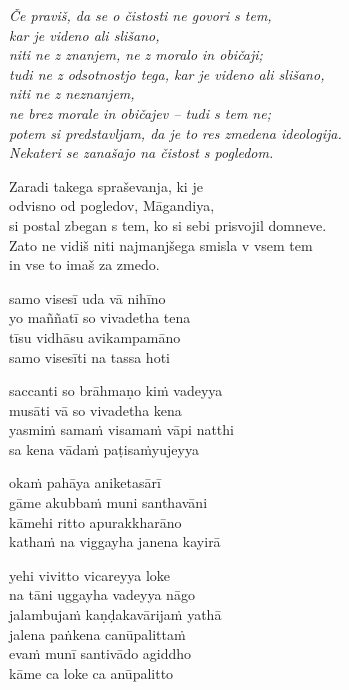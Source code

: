 \emph{Če praviš, da se o čistosti ne govori s tem,\\\vin kar je videno ali slišano,\\
niti ne z znanjem, ne z moralo in običaji;\\
tudi ne z odsotnostjo tega, kar je videno ali slišano,\\\vin niti ne z neznanjem,\\
ne brez morale in običajev -- tudi s tem ne;\\
potem si predstavljam, da je to res zmedena ideologija.\\
Nekateri se zanašajo na čistost s pogledom.}

Zaradi takega spraševanja, ki je\\\vin odvisno od pogledov, Māgandiya,\\
si postal zbegan s tem, ko si sebi prisvojil domneve.\\
Zato ne vidiš niti najmanjšega smisla v vsem tem\\
in vse to imaš za zmedo.


\clearpage

samo visesī uda vā nihīno\\
yo maññatī so vivadetha tena\\
tīsu vidhāsu avikampamāno\\
samo visesīti na tassa hoti

saccanti so brāhmaṇo kiṁ vadeyya\\
musāti vā so vivadetha kena\\
yasmiṁ samaṁ visamaṁ vāpi natthi\\
sa kena vādaṁ paṭisaṁyujeyya

okaṁ pahāya aniketasārī\\
gāme akubbaṁ muni santhavāni\\
kāmehi ritto apurakkharāno\\
kathaṁ na viggayha janena kayirā

yehi vivitto vicareyya loke\\
na tāni uggayha vadeyya nāgo\\
jalambujaṁ kaṇḍakavārijaṁ yathā\\
jalena paṅkena canūpalittaṁ\\
evaṁ munī santivādo agiddho\\
kāme ca loke ca anūpalitto


